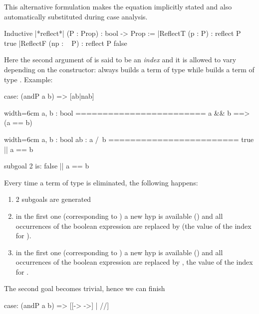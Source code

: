 This alternative formulation makes the equation implicitly stated and
also automatically substituted during case analysis.

\begin{coq}{}{}
Inductive |*reflect*| (P : Prop) : bool -> Prop :=
|ReflectT (p : P)    : reflect P true
|ReflectF (np : ~ P) : reflect P false
\end{coq}

Here the second argument of  is said to be an \emph{index}
and it is allowed to vary depending on the constructor:  always
builds a term of type  while  builds
a term of type .
Example:

\begin{coq}{}{}
case: (andP a b) => [ab|nab]
\end{coq}

\begin{coqout}{}{width=6cm}
a, b : bool
========================
a && b ==> (a == b)
\end{coqout}
\begin{coqout}{}{width=6cm}
a, b : bool
ab : a /\ b
========================
true || a == b

subgoal 2 is:
false || a == b
\end{coqout}

Every time a term of type  is eliminated, the
following happens:
\begin{enumerate}
\item 2 subgoals are generated
\item in the first one (corresponding to ) a new hyp is
  available () and all occurrences of the boolean
  expression  are replaced by  (the value of the index
  for ).
\item in the first one (corresponding to ) a new hyp is
  available () and all occurrences of the boolean
  expression  are replaced by , the value of
  the index for .
\end{enumerate}

The second goal becomes trivial, hence we can finish

\begin{coq}{}{}
case: (andP a b) => [[-> ->] | //]
\end{coq}

